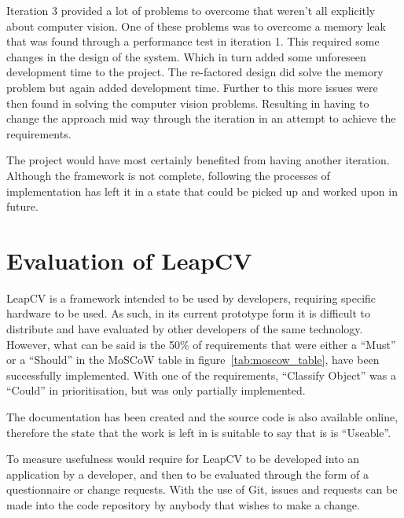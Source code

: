 \documentclass[11pt,oneside]{report}
\begin{document}
		Iteration 3 provided a lot of problems to overcome that weren't all explicitly about computer vision.
		One of these problems was to overcome a memory leak that was found through a performance test in iteration 1.
		This required some changes in the design of the system.
		Which in turn added some unforeseen development time to the project.
		The re-factored design did solve the memory problem but again added development time.
		Further to this more issues were then found in solving the computer vision problems.
		Resulting in having to change the approach mid way through the iteration in an attempt to achieve the requirements.
		
		The project would have most certainly benefited from having another iteration.
		Although the framework is not complete, following the processes of implementation has left it in a state that could be picked up and worked upon in future.
		
	\section{Evaluation of LeapCV}
		LeapCV is a framework intended to be used by developers, requiring specific hardware to be used.
		As such, in its current prototype form it is difficult to distribute and have evaluated by other developers of the same technology.
		However, what can be said is the 50\% of requirements that were either a ``Must'' or a ``Should'' in the MoSCoW table in figure~\ref{tab:moscow_table}, have been successfully implemented.
		With one of the requirements, ``Classify Object'' was a ``Could'' in prioritisation, but was only partially implemented.
		
		The documentation has been created and the source code is also available online, therefore the state that the work is left in is suitable to say that is is ``Useable''.
		
		To measure usefulness would require for LeapCV to be developed into an application by a developer, and then to be evaluated through the form of a questionnaire or change requests.
		With the use of Git, issues and requests can be made into the code repository by anybody that wishes to make a change.
		
\end{document}
